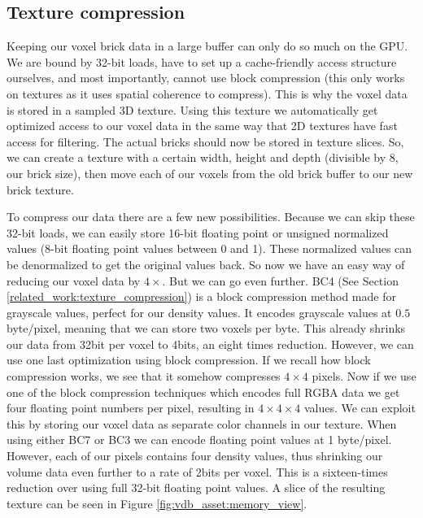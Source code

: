 \subsection{Texture compression} \label{approach:texture_compression}
Keeping our voxel brick data in a large buffer can only do so much on the GPU. We are bound by 32-bit loads, have to set up a cache-friendly access structure ourselves, and most importantly, cannot use block compression (this only works on textures as it uses spatial coherence to compress). This is why the voxel data is stored in a sampled 3D texture. Using this texture we automatically get optimized access to our voxel data in the same way that 2D textures have fast access for filtering. The actual bricks should now be stored in texture slices. So, we can create a texture with a certain width, height and depth (divisible by 8, our brick size), then move each of our voxels from the old brick buffer to our new brick texture.


To compress our data there are a few new possibilities. Because we can skip these 32-bit loads, we can easily store 16-bit floating point or unsigned normalized values (8-bit floating point values between 0 and 1). These normalized values can be denormalized to get the original values back. So now we have an easy way of reducing our voxel data by $4\times$. But we can go even further. BC4 (See Section \ref{related_work:texture_compression}) is a block compression method made for grayscale values, perfect for our density values. It encodes grayscale values at $0.5$ byte/pixel, meaning that we can store two voxels per byte. This already shrinks our data from 32bit per voxel to 4bits, an eight times reduction. However, we can use one last optimization using block compression. If we recall how block compression works, we see that it somehow compresses $4\times 4$ pixels. Now if we use one of the block compression techniques which encodes full RGBA data we get four floating point numbers per pixel, resulting in $4 \times 4 \times 4$ values. We can exploit this by storing our voxel data as separate color channels in our texture. When using either BC7 or BC3 we can encode floating point values at 1 byte/pixel. However, each of our pixels contains four density values, thus shrinking our volume data even further to a rate of 2bits per voxel. This is a sixteen-times reduction over using full 32-bit floating point values. A slice of the resulting texture can be seen in Figure \ref{fig:vdb_asset:memory_view}.

